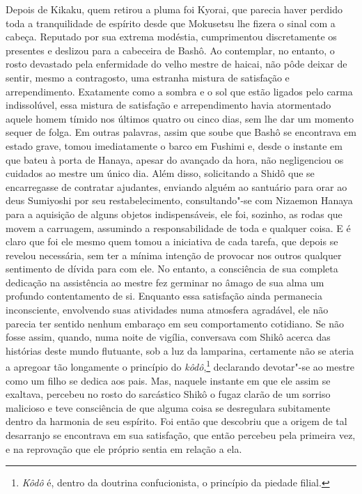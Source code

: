 Depois de Kikaku, quem retirou a pluma foi Kyorai, que parecia haver
perdido toda a tranquilidade de espírito desde que Mokusetsu lhe fizera
o sinal com a cabeça. Reputado por sua extrema modéstia, cumprimentou
discretamente os presentes e deslizou para a cabeceira de Bashô. Ao
contemplar, no entanto, o rosto devastado pela enfermidade do velho
mestre de haicai, não pôde deixar de sentir, mesmo a contragosto, uma
estranha mistura de satisfação e arrependimento. Exatamente como a
sombra e o sol que estão ligados pelo carma indissolúvel, essa mistura
de satisfação e arrependimento havia atormentado aquele homem tímido
nos últimos quatro ou cinco dias, sem lhe dar um momento sequer de
folga. Em outras palavras, assim que soube que Bashô se encontrava em
estado grave, tomou imediatamente o barco em Fushimi e, desde o
instante em que bateu à porta de Hanaya, apesar do avançado da hora,
não negligenciou os cuidados ao mestre um único dia. Além disso,
solicitando a Shidô que se encarregasse de contratar ajudantes,
enviando alguém ao santuário para orar ao deus Sumiyoshi por seu
restabelecimento, consultando"-se com Nizaemon Hanaya para a aquisição
de alguns objetos indispensáveis, ele foi, sozinho, as rodas que movem 
a carruagem, assumindo a responsabilidade de toda e
qualquer coisa. E é claro que foi ele mesmo quem tomou a iniciativa de
cada tarefa, que depois se revelou necessária, sem ter a mínima
intenção de provocar nos outros qualquer sentimento de dívida para com
ele. No entanto, a consciência de sua completa dedicação na assistência
ao mestre fez germinar no âmago de sua alma um profundo contentamento
de si. Enquanto essa satisfação ainda permanecia inconsciente,
envolvendo suas atividades numa atmosfera agradável, ele não parecia
ter sentido nenhum embaraço em seu comportamento cotidiano. Se não
fosse assim, quando, numa noite de vigília, conversava com Shikô acerca
das histórias deste  mundo flutuante, sob a luz da lamparina,
certamente não se ateria a apregoar tão longamente o princípio do
\textit{kôdô},\footnote{ \textit{Kôdô} é, dentro da doutrina
confucionista, o princípio da piedade filial.} declarando
devotar"-se ao mestre como um filho se dedica aos pais. Mas, naquele
instante em que ele assim se exaltava, percebeu no rosto do sarcástico
Shikô o fugaz clarão de um sorriso malicioso e teve consciência de que
alguma coisa se desregulara subitamente dentro da harmonia de seu
espírito. Foi então que descobriu que a origem de tal desarranjo se
encontrava em sua satisfação, que então percebeu pela primeira vez, e
na reprovação que ele próprio sentia em relação a ela.

